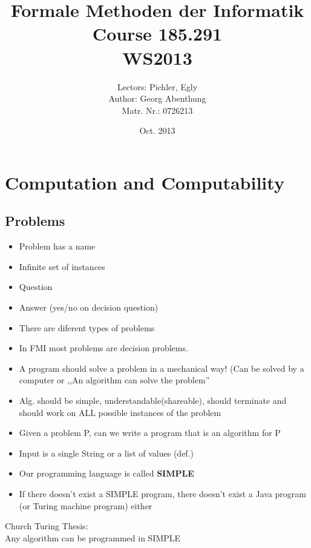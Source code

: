 \documentclass[a4paper]{article}
\begin{document}
	\title{\textbf{Formale Methoden der Informatik}\\ Course 185.291 \\WS2013}
	\author{Lectors: Pichler, Egly \\ Author: Georg Abenthung \\ Matr. Nr.: 0726213
	}
	\date{Oct. 2013}

	\maketitle
	\thispagestyle{empty}
	\newpage
	
	
	
	\newpage
\section{Computation and Computability}
\subsection{Problems}
\begin{itemize}
  \item {Problem has a name}
  \item {Infinite set of instances}
  \item {Question}
  \item {Answer (yes/no on decision question)}
  \item There are diferent types of problems
  \item In FMI most problems are decision problems.
  \item A program should solve a problem in a mechanical way! (Can be solved by
  a computer or ,,An algorithm can solve the problem''
  \item Alg. should be simple, understandable(shareable), should terminate and
  should work on ALL possible instances of the problem
  \item Given a problem P, can we write a program that is an algorithm for P
  \item Input is a single String or a list of values (def.)
  \item Our programming language is called \textbf{SIMPLE}
  \item If there doesn't exist a SIMPLE program, there doesn't exist a Java
  program (or Turing machine program) either
 \end{itemize}\begin{framed}Church Turing Thesis:\\ Any algorithm can be programmed
in SIMPLE
\end{framed}
\end{document}
